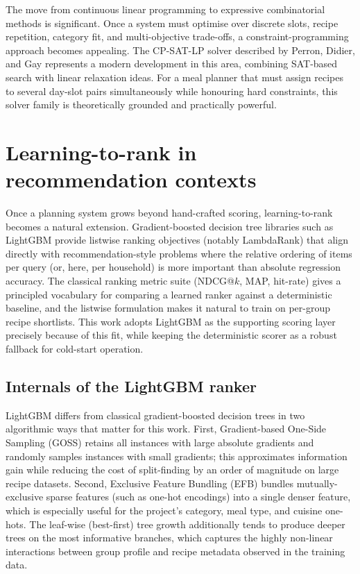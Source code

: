 The move from continuous linear programming to expressive combinatorial methods is significant. Once a system must optimise over discrete slots, recipe repetition, category fit, and multi-objective trade-offs, a constraint-programming approach becomes appealing. The CP-SAT-LP solver described by Perron, Didier, and Gay \cite{perron2023} represents a modern development in this area, combining SAT-based search with linear relaxation ideas. For a meal planner that must assign recipes to several day-slot pairs simultaneously while honouring hard constraints, this solver family is theoretically grounded and practically powerful.

\section{Learning-to-rank in recommendation contexts}

Once a planning system grows beyond hand-crafted scoring, learning-to-rank becomes a natural extension. Gradient-boosted decision tree libraries such as LightGBM \cite{ke2017} provide listwise ranking objectives (notably LambdaRank) that align directly with recommendation-style problems where the relative ordering of items per query (or, here, per household) is more important than absolute regression accuracy. The classical ranking metric suite (NDCG@$k$, MAP, hit-rate) gives a principled vocabulary for comparing a learned ranker against a deterministic baseline, and the listwise formulation makes it natural to train on per-group recipe shortlists. This work adopts LightGBM as the supporting scoring layer precisely because of this fit, while keeping the deterministic scorer as a robust fallback for cold-start operation.

\subsection{Internals of the LightGBM ranker}

LightGBM \cite{ke2017lightgbm} differs from classical gradient-boosted decision trees in two algorithmic ways that matter for this work. First, Gradient-based One-Side Sampling (GOSS) retains all instances with large absolute gradients and randomly samples instances with small gradients; this approximates information gain while reducing the cost of split-finding by an order of magnitude on large recipe datasets. Second, Exclusive Feature Bundling (EFB) bundles mutually-exclusive sparse features (such as one-hot encodings) into a single denser feature, which is especially useful for the project's category, meal type, and cuisine one-hots. The leaf-wise (best-first) tree growth additionally tends to produce deeper trees on the most informative branches, which captures the highly non-linear interactions between group profile and recipe metadata observed in the training data.

